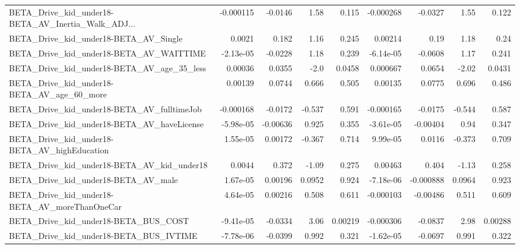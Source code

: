 \begin{tabular}{lrrrrrrrr}
BETA\_Drive\_kid\_under18-BETA\_AV\_Inertia\_Walk\_ADJ... &   -0.000115 &      -0.0146 &     1.58 &    0.115 &  -0.000268 &     -0.0327 &         1.55 &         0.122 \\
BETA\_Drive\_kid\_under18-BETA\_AV\_Single              &      0.0021 &        0.182 &     1.16 &    0.245 &    0.00214 &        0.19 &         1.18 &          0.24 \\
BETA\_Drive\_kid\_under18-BETA\_AV\_WAITTIME            &   -2.13e-05 &      -0.0228 &     1.18 &    0.239 &  -6.14e-05 &     -0.0608 &         1.17 &         0.241 \\
BETA\_Drive\_kid\_under18-BETA\_AV\_age\_35\_less         &     0.00036 &       0.0355 &     -2.0 &   0.0458 &   0.000667 &      0.0654 &        -2.02 &        0.0431 \\
BETA\_Drive\_kid\_under18-BETA\_AV\_age\_60\_more         &     0.00139 &       0.0744 &    0.666 &    0.505 &    0.00135 &      0.0775 &        0.696 &         0.486 \\
BETA\_Drive\_kid\_under18-BETA\_AV\_fulltimeJob         &   -0.000168 &      -0.0172 &   -0.537 &    0.591 &  -0.000165 &     -0.0175 &       -0.544 &         0.587 \\
BETA\_Drive\_kid\_under18-BETA\_AV\_haveLicense         &   -5.98e-05 &     -0.00636 &    0.925 &    0.355 &  -3.61e-05 &    -0.00404 &         0.94 &         0.347 \\
BETA\_Drive\_kid\_under18-BETA\_AV\_highEducation       &    1.55e-05 &      0.00172 &   -0.367 &    0.714 &   9.99e-05 &      0.0116 &       -0.373 &         0.709 \\
BETA\_Drive\_kid\_under18-BETA\_AV\_kid\_under18         &      0.0044 &        0.372 &    -1.09 &    0.275 &    0.00463 &       0.404 &        -1.13 &         0.258 \\
BETA\_Drive\_kid\_under18-BETA\_AV\_male                &    1.67e-05 &      0.00196 &   0.0952 &    0.924 &  -7.18e-06 &   -0.000888 &       0.0964 &         0.923 \\
BETA\_Drive\_kid\_under18-BETA\_AV\_moreThanOneCar      &    4.64e-05 &      0.00216 &    0.508 &    0.611 &  -0.000103 &    -0.00486 &        0.511 &         0.609 \\
BETA\_Drive\_kid\_under18-BETA\_BUS\_COST               &   -9.41e-05 &      -0.0334 &     3.06 &  0.00219 &  -0.000306 &     -0.0837 &         2.98 &       0.00288 \\
BETA\_Drive\_kid\_under18-BETA\_BUS\_IVTIME             &   -7.78e-06 &      -0.0399 &    0.992 &    0.321 &  -1.62e-05 &     -0.0697 &        0.991 &         0.322 \\

\end{tabular}
